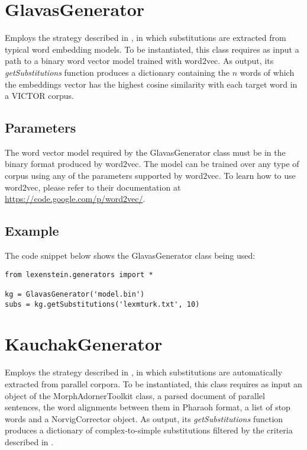 \section{GlavasGenerator}

Employs the strategy described in \cite{glavas2015}, in which substitutions are extracted from typical word embedding models. To be instantiated, this class requires as input a path to a binary word vector model trained with word$2$vec. As output, its \textit{getSubstitutions} function produces a dictionary containing the $n$ words of which the embeddings vector has the highest cosine similarity with each target word in a VICTOR corpus.

\subsection{Parameters}

The word vector model required by the GlavasGenerator class must be in the binary format produced by word$2$vec. The model can be trained over any type of corpus using any of the parameters supported by word$2$vec. To learn how to use word$2$vec, please refer to their documentation at \url{https://code.google.com/p/word2vec/}.



\subsection{Example}

The code snippet below shows the GlavasGenerator class being used:

\begin{lstlisting}
from lexenstein.generators import *

kg = GlavasGenerator('model.bin')
subs = kg.getSubstitutions('lexmturk.txt', 10)
\end{lstlisting}













\section{KauchakGenerator}

Employs the strategy described in \cite{Horn2014}, in which substitutions are automatically extracted from parallel corpora. To be instantiated, this class requires as input an object of the MorphAdornerToolkit class, a parsed document of parallel sentences, the word alignments between them in Pharaoh format, a list of stop words and a NorvigCorrector object. As output, its \textit{getSubstitutions} function produces a dictionary of complex-to-simple substitutions filtered by the criteria described in \cite{Horn2014}.

